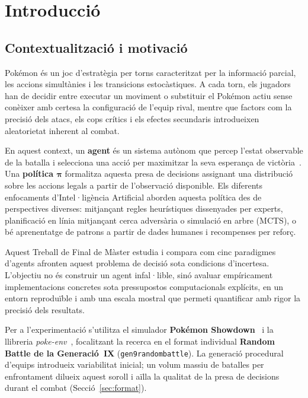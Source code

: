 \chapter{Introducció}
\label{chap:introduccio}

\section{Contextualització i motivació}

Pokémon és un joc d'estratègia per torns caracteritzat per la informació parcial, les accions simultànies i les transicions estocàstiques. A cada torn, els jugadors han de decidir entre executar un moviment o substituir el Pokémon actiu sense conèixer amb certesa la configuració de l'equip rival, mentre que factors com la precisió dels atacs, els cops crítics i els efectes secundaris introdueixen aleatorietat inherent al combat.

En aquest context, un \textbf{agent} és un sistema autònom que percep l'estat observable de la batalla i selecciona una acció per maximitzar la seva esperança de victòria~\cite{russell_norvig,wooldridge_mas}. Una \textbf{política $\boldsymbol{\pi}$} formalitza aquesta presa de decisions assignant una distribució sobre les accions legals a partir de l'observació disponible. Els diferents enfocaments d'Intel·ligència Artificial aborden aquesta política des de perspectives diverses: mitjançant regles heurístiques dissenyades per experts, planificació en línia mitjançant cerca adversària o simulació en arbre (MCTS), o bé aprenentatge de patrons a partir de dades humanes i recompenses per reforç.

Aquest Treball de Final de Màster estudia i compara com cinc paradigmes d'agents afronten aquest problema de decisió sota condicions d'incertesa. L'objectiu no és construir un agent infal·lible, sinó avaluar empíricament implementacions concretes sota pressupostos computacionals explícits, en un entorn reproduïble i amb una escala mostral que permeti quantificar amb rigor la precisió dels resultats.

Per a l'experimentació s'utilitza el simulador \textbf{Pokémon Showdown}~\cite{pokemon_showdown} i la llibreria \textit{poke-env}~\cite{poke_env}, focalitzant la recerca en el format individual \textbf{Random Battle de la Generació~IX} (\texttt{gen9randombattle}). La generació procedural d'equips introdueix variabilitat inicial; un volum massiu de batalles per enfrontament dilueix aquest soroll i aïlla la qualitat de la presa de decisions durant el combat (Secció~\ref{sec:format}).

